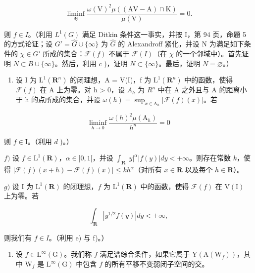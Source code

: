 \[
\operatorname * {l i m i n f} _ {\mathfrak {B}} \frac {\omega (\mathrm{V}) ^ {2} \mu ((\mathrm{AV-A}) \cap \mathrm{K})}{\mu (\mathrm{V})} = 0.
\]

则 \(f \in I\)。（利用 \(L^1(G)\) 满足 Ditkin 条件这一事实，并按 I，第 94 页，命题 5 的方式论证；设 \(G' = \widehat{G} \cup \{\infty\}\) 为 \(\widehat{G}\) 的 Alexandroff 紧化，并设 N 为满足如下条件的 \(\chi \in G'\) 所成的集合：\(\mathcal{F}(f)\) 不属于 \(\mathcal{F}(I)\)（在 \(\chi\) 的一个邻域中）。首先证明 \(N \subset B \cup \{\infty\}\)。然后，利用 \(c\) )，证明 \(N \subset \{\infty\}\)。最后，证明 \(N = \varnothing\)。）

\begin{enumerate}
\def\labelenumi{\alph{enumi})}
\setcounter{enumi}{4}
\tightlist
\item
  设 I 为 \(\mathrm{L}^{1}(\mathbf{R}^{n})\) 的闭理想，A = V(I)，f 为 \(\mathrm{L}^{1}(\mathbf{R}^{n})\) 中的函数，使得 \(\mathcal{F}(f)\) 在 A 上为零。对 h \textgreater{} 0，设 \(A_{h}\) 为 \(R^{n}\) 中在 A 之外且与 A 的距离小于 h 的点所成的集合，并设 \(\omega(h) = \sup_{x \in \mathrm{A}_{h}} |\mathcal{F}(f)(x)|\)。若
\end{enumerate}

\[
\liminf _ {h \to 0} \frac {\omega (h) ^ {2} \mu (\mathrm{A} _ {h})}{h ^ {n}} = 0
\]

则 \(f\in \mathrm{I}\)。（利用 \(d\) )。）

\(f)\) 设 \(f \in \mathrm{L}^{1}(\mathbf{R})\)，\(\alpha \in]0,1[\)，并设 \(\int_{\mathbf{R}} |y|^{\alpha}| f(y)| dy < +\infty\)。则存在常数 \(k\)，使得 \(|\mathcal{F}(f)(x+h)-\mathcal{F}(f)(x)| \leqslant kh^{\alpha}\)（对所有 \(x \in \mathbf{R}\) 以及每个 \(h \in \mathbf{R}\)）。

\(g)\) 设 I 为 \(\mathrm{L}^1 (\mathbf{R})\) 的闭理想，\(f\) 为 \(\mathrm{L}^1 (\mathbf{R})\) 中的函数，使得 \(\mathcal{F}(f)\) 在 \(\mathrm{V(I)}\) 上为零。若

\[
\int_ {\mathbf {R}} | y ^ {1 / 2} f (y) | d y <   + \infty ,
\]

则我们有 \(f \in I\)。（利用 e) 与 f)。）

\begin{enumerate}
\def\labelenumi{\arabic{enumi})}
\setcounter{enumi}{15}
\tightlist
\item
  设 \(f \in \mathrm{L}^{\infty}(\mathrm{G})\)。我们称 \(f\) 满足谱综合条件，如果它属于 \(\mathrm{Y}(\mathrm{A}(\mathrm{W}_f))\)，其中 \(\mathrm{W}_f\) 是 \(\mathrm{L}^{\infty}(\mathrm{G})\) 中包含 \(f\) 的所有平移不变弱闭子空间的交。
\end{enumerate}

